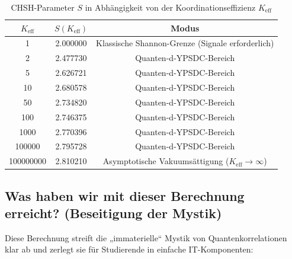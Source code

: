 \documentclass[12pt,a4paper]{article}
\begin{document}
	\begin{table}[htbp]
		\centering
		\small
		\setlength{\tabcolsep}{4pt}
		\caption{CHSH-Parameter \(S\) in Abhängigkeit von der Koordinationseffizienz \(K_{\mathrm{eff}}\)}
		\label{tab:bell_yuct}
		\begin{tabular}{ccc}
			\toprule
			\(K_{\mathrm{eff}}\) & \(S(K_{\mathrm{eff}})\) & Modus \\
			\midrule
			1            & 2.000000 & Klassische Shannon-Grenze (Signale erforderlich) \\
			2            & 2.477730 & Quanten-d‑YPSDC-Bereich \\
			5            & 2.626721 & Quanten-d‑YPSDC-Bereich \\
			10           & 2.680578 & Quanten-d‑YPSDC-Bereich \\
			50           & 2.734820 & Quanten-d‑YPSDC-Bereich \\
			100          & 2.746375 & Quanten-d‑YPSDC-Bereich \\
			1000         & 2.770396 & Quanten-d‑YPSDC-Bereich \\
			100000       & 2.795728 & Quanten-d‑YPSDC-Bereich \\
			100000000    & 2.810210 & Asymptotische Vakuumsättigung (\(K_{\mathrm{eff}} \to \infty\)) \\
			\bottomrule
		\end{tabular}
	\end{table}
	
	\subsection{Was haben wir mit dieser Berechnung erreicht? (Beseitigung der Mystik)}
	
	Diese Berechnung streift die „immaterielle“ Mystik von Quantenkorrelationen klar ab und zerlegt sie für Studierende in einfache IT-Komponenten:
	
\end{document}
